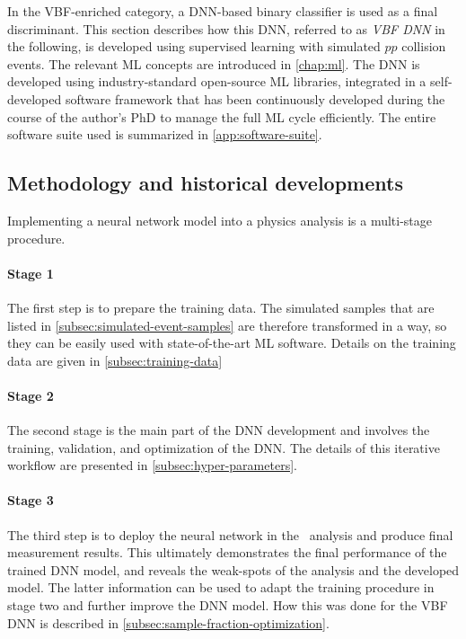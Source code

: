 In the VBF-enriched \TwoJet category, a DNN-based binary classifier is used as a final discriminant.
This section describes how this DNN, referred to as \emph{VBF DNN} in the following, is developed using supervised learning with simulated $pp$ collision events.
The relevant ML concepts are introduced in \cref{chap:ml}.
The DNN is developed using industry-standard open-source ML libraries, integrated in a self-developed software framework that has been continuously developed during the course of the author's PhD to manage the full ML cycle efficiently. The entire software suite used is summarized in \cref{app:software-suite}.

\subsection{Methodology and historical developments}
Implementing a neural network model into a physics analysis is a multi-stage procedure. 

\paragraph{Stage 1}
The first step is to prepare the training data.
The simulated samples that are listed in \cref{subsec:simulated-event-samples} are therefore transformed in a way, so they can be easily used with state-of-the-art ML software. Details on the training data are given in \cref{subsec:training-data}

\paragraph{Stage 2}
The second stage is the main part of the DNN development and involves the training, validation, and optimization of the DNN. The details of this iterative workflow are presented in \cref{subsec:hyper-parameters}.

\paragraph{Stage 3}
The third step is to deploy the neural network in the \HWW\ analysis and produce final measurement results. This ultimately demonstrates the final performance of the trained DNN model, and reveals the weak-spots of the analysis and the developed model. The latter information can be used to adapt the training procedure in stage two and further improve the DNN model. 
How this was done for the VBF DNN is described in \cref{subsec:sample-fraction-optimization}.

